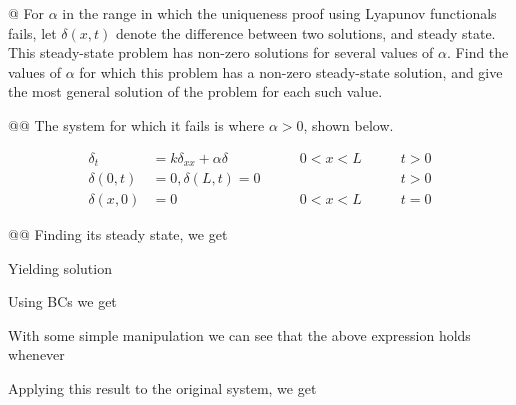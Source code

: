 \documentclass[10pt]{article}
\begin{document}
\begin{easylist}[enumerate]
\nosimpleweave

    @ For $\alpha$ in the range in which the uniqueness proof using Lyapunov functionals fails, let $\delta(x, t)$
    denote the difference between two solutions, and steady state. This steady-state problem has non-zero solutions for
    several values of $\alpha$. Find the values of $\alpha$ for which this problem has a non-zero steady-state solution,
    and give the most general solution of the problem for each such value.

    @@ The system for which it fails is where $\alpha > 0$, shown below.

    \begin{align}\label{1:delta}
        \delta_t &= k \delta_{xx} + \alpha \delta \qquad & 0 < x < L \qquad & t > 0 \nonumber \\
        \delta(0, t) &= 0, \delta(L, t) = 0 \qquad && t > 0\\
        \delta(x, 0) &= 0 \qquad & 0 < x < L \qquad & t = 0 \nonumber
    \end{align}

    @@ Finding its steady state, we get


    Yielding solution


    Using BCs we get


    With some simple manipulation we can see that the above expression holds whenever


    Applying this result to the original system, we get


\end{easylist}
\end{document}
